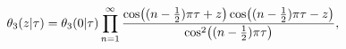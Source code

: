 \[\mathop{\theta_{3}\/}\nolimits\!\left(z\middle|\tau\right)=\mathop{\theta_{3}%
\/}\nolimits\!\left(0\middle|\tau\right)\prod_{n=1}^{\infty}\frac{\mathop{\cos%
\/}\nolimits\!\left((n-\tfrac{1}{2})\pi\tau+z\right)\mathop{\cos\/}\nolimits\!%
\left((n-\tfrac{1}{2})\pi\tau-z\right)}{{\mathop{\cos\/}\nolimits^{2}}\!\left(%
(n-\tfrac{1}{2})\pi\tau\right)},\]